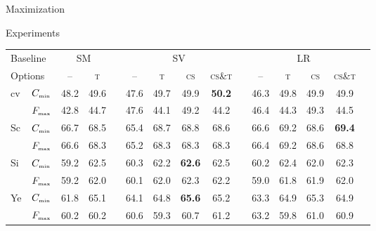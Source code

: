 \documentclass[12pt]{beamer}
\begin{document}
\begin{frame}{Maximization}
\begin{block}{Experiments}
\newcommand{\Cm}{$C_{\text{\tiny min}}$}
\newcommand{\Fm}{$F_{\text{\tiny max}}$}
\begin{table}
  \centering
    \setlength{\tabcolsep}{2.5pt}
  \begin{tabular}{l@{\ }c*{13}{c}}
        \toprule
        \multicolumn{2}{l}{Baseline}
        & \multicolumn{2}{c}{SM} && \multicolumn{4}{c}{SV} && \multicolumn{4}{c}{LR} \\
        \cmidrule(lr){3-4} \cmidrule(lr){6-9} \cmidrule(lr){11-14}
        \multicolumn{2}{l}{Options}
        & -- & \scshape t && -- & \scshape t & \scshape cs & \scshape cs{\scriptsize\&}t && -- & \scshape t & \scshape cs & \scshape cs{\scriptsize\&}t \\
        \midrule
        \multicolumn{1}{l}{\multirow{2}{*}{cv}} & \Cm & 48.2 & 49.6 && 47.6 & 49.7 & 49.9 & \textbf{50.2} && 46.3 & 49.8 & 49.9 & 49.9 \\
        \multicolumn{1}{l}{} & \Fm & 42.8 & 44.7 && 47.6 & 44.1 & 49.2 & 44.2 && 46.4 & 44.3 & 49.3 & 44.5 \\
        \hline
        \multicolumn{1}{l}{\multirow{2}{*}{Sc}} & \Cm & 66.7 & 68.5 && 65.4 & 68.7 & 68.8 & 68.6 && 66.6 & 69.2 & 68.6 & \textbf{69.4} \\
        \multicolumn{1}{l}{} & \Fm & 66.6 & 68.3 && 65.2 & 68.3 & 68.3 & 68.3 && 66.4 & 69.2 & 68.6 & 68.8 \\
        \hline
        \multicolumn{1}{l}{\multirow{2}{*}{Si}} & \Cm & 59.2 & 62.5 && 60.3 & 62.2 & \textbf{62.6} & 62.5 && 60.2 & 62.4 & 62.0 & 62.3 \\
        \multicolumn{1}{l}{} & \Fm & 59.2 & 62.0 && 60.1 & 62.0 & 62.3 & 62.2 && 59.0 & 61.8 & 61.9 & 62.0 \\
        \hline
        \multicolumn{1}{l}{\multirow{2}{*}{Ye}} & \Cm & 61.8 & 65.1 && 64.1 & 64.8 & \textbf{65.6} & 65.2 && 63.3 & 64.9 & 65.3 & 64.9 \\
        \multicolumn{1}{l}{} & \Fm & 60.2 & 60.2 && 60.6 & 59.3 & 60.7 & 61.2 && 63.2 & 59.8 & 61.0 & 60.9 \\
        \bottomrule
  \end{tabular}
\end{table}
\end{block}
\end{frame}
\end{document}
